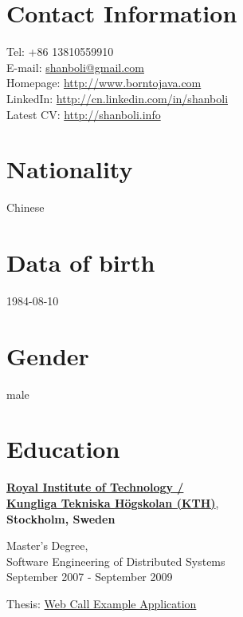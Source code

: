 
\section{Contact Information}
%
%
%
\newlength{\rcollength}\setlength{\rcollength}{3.2in}%
%
Tel: \textsf{+86 13810559910} \\
E-mail: \href{mailto:shanboli@gmail.com}{shanboli@gmail.com}\\
Homepage: \href{http://www.borntojava.com/}{http://www.borntojava.com}\\
LinkedIn: \href{http://cn.linkedin.com/in/shanboli}{http://cn.linkedin.com/in/shanboli}\\
Latest CV:
\href{http://shanboli.info/}{http://shanboli.info}

\section{Nationality}
%
Chinese

\section{Data of birth}
%
1984-08-10

\section{Gender}
%
male

\section{Education}
%
\href{http://www.kth.se/}{\textbf{Royal Institute of Technology /\\ Kungliga Tekniska H\"{o}gskolan (KTH)}},\\ 
\textbf{Stockholm, Sweden}
\begin{outerlist}
\item[] Master's Degree,\\ 
        {Software Engineering of Distributed Systems} \\
        September 2007 - September 2009
\item[] Thesis: \href{http://shanbohomepage.googlecode.com/hg/master_thesis/master_thesis.pdf}{Web Call Example Application}
\end{outerlist}
\blankline

